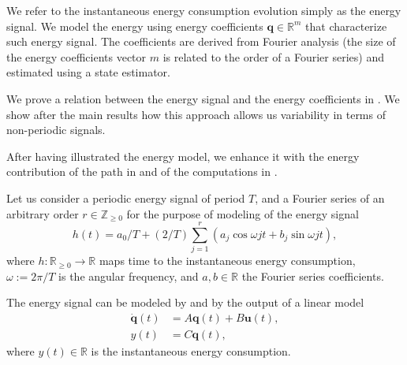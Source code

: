 We refer to the instantaneous energy consumption evolution simply as the energy signal. We model the energy using energy coefficients $\mathbf{q}\in\mathbb{R}^m$ that characterize such energy signal. The coefficients are derived from Fourier analysis (the size of the energy coefficients vector $m$ is related to the order of a Fourier series) and estimated using a state estimator. 

We prove a relation between the energy signal and the energy coefficients in . We show after the main results how this approach allows us variability in terms of non-periodic signals.

After having illustrated the energy model, we enhance it with the energy contribution of the path in and of the computations in . 

Let us consider a periodic energy signal of period $T$, and a Fourier series of an arbitrary order $r\in\mathbb{Z}_{\geq 0}$ for the purpose of modeling of the energy signal
\begin{equation}\label{eq:fourier}
  h(t)=a_0/T+(2/T)\sum_{j=1}^{r}{\left(a_j\cos{\omega jt}+b_j\sin{\omega jt}\right)},
\end{equation}
where $h:\mathbb{R}_{\geq 0}\rightarrow\mathbb{R}$ maps time to the instantaneous energy consumption, $\omega:=2\pi/T$ is the angular frequency, and $a,b\in\mathbb{R}$ the Fourier series coefficients.

The energy signal can be modeled by  and by the output of a linear model
\begin{subequations}\label{eq:state-perf}\begin{align}
  \dot{\mathbf{q}}(t)&=A\mathbf{q}(t)+B\mathbf{u}(t),\\
  y(t)&=C\mathbf{q}(t),
\end{align}\end{subequations}
where $y(t)\in\mathbb{R}$ is the instantaneous energy consumption. 

